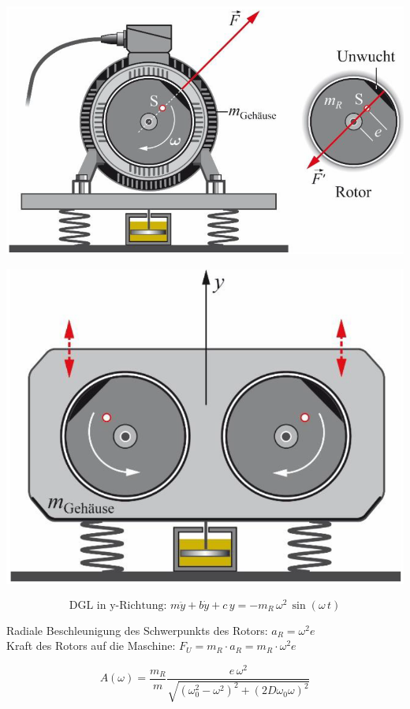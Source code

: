 \begin{minipage}{0.52\linewidth}
\includegraphics[width=0.9\linewidth]{Bilder/Wellen-Optik/unwucht} \\
\end{minipage}
\hfill
\begin{minipage}{0.44\linewidth}
\includegraphics[width=0.89\linewidth]{Bilder/Wellen-Optik/unwucht_gehause} \\
\end{minipage}

$$ \boxed{ \text{DGL in y-Richtung: } m \ddot{y} + b \dot{y} + c \, y = -m_R \, \omega^2 \, \sin(\omega \, t) }  $$

Radiale Beschleunigung des Schwerpunkts des Rotors: $a_R = \omega^2 e$ \\

Kraft des Rotors auf die Maschine: $\boxed{ F_U = m_R \cdot a_R = m_R \cdot \omega^2 e } $ 

$$ A(\omega) = \frac{m_R}{m} \frac{e \, \omega^2}{\sqrt{(\omega_0^2 -\omega^2)^2 + (2D \omega_0 \omega)^2}}  $$ 


